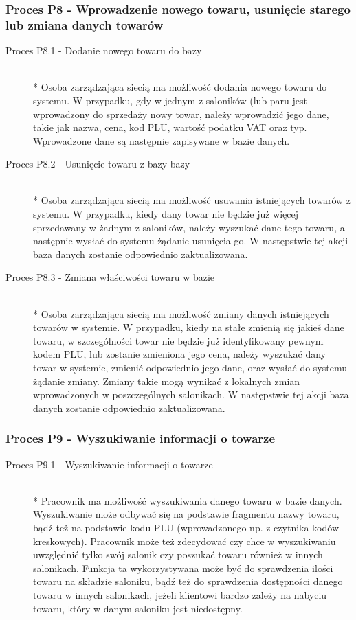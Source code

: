 \subsubsection{Proces P8 - Wprowadzenie nowego towaru, usunięcie starego lub zmiana danych towarów}
\begin{description}
\item[Proces P8.1 - Dodanie nowego towaru do bazy] ~\\*
Osoba zarządzająca siecią ma możliwość dodania nowego towaru do systemu. W przypadku, gdy w jednym z saloników (lub paru jest wprowadzony do sprzedaży nowy towar, należy wprowadzić jego dane, takie jak nazwa, cena, kod PLU, wartość podatku VAT oraz typ. Wprowadzone dane są następnie zapisywane w bazie danych.
\item[Proces P8.2 - Usunięcie towaru z bazy bazy] ~\\*
Osoba zarządzająca siecią ma możliwość usuwania istniejących towarów z systemu. W przypadku, kiedy dany towar nie będzie już więcej sprzedawany w żadnym z saloników, należy wyszukać dane tego towaru, a następnie wysłać do systemu żądanie usunięcia go. W następstwie tej akcji baza danych zostanie odpowiednio zaktualizowana.
\item[Proces P8.3 - Zmiana właściwości towaru w bazie] ~\\*
Osoba zarządzająca siecią ma możliwość zmiany danych istniejących towarów w systemie. W przypadku, kiedy na stałe zmienią się jakieś dane towaru, w szczególności towar nie będzie już identyfikowany pewnym kodem PLU, lub zostanie zmieniona jego cena, należy wyszukać dany towar w systemie, zmienić odpowiednio jego dane, oraz wysłać do systemu żądanie zmiany. Zmiany takie mogą wynikać z lokalnych zmian wprowadzonych w poszczególnych salonikach. W następstwie tej akcji baza danych zostanie odpowiednio zaktualizowana.
\end{description}
\subsubsection{Proces P9 - Wyszukiwanie informacji o towarze}
\begin{description}
\item[Proces P9.1 - Wyszukiwanie informacji o towarze] ~\\*
Pracownik ma możliwość wyszukiwania danego towaru w bazie danych. Wyszukiwanie może odbywać się na podstawie fragmentu nazwy towaru, bądź też na podstawie kodu PLU (wprowadzonego np. z czytnika kodów kreskowych). Pracownik może też zdecydować czy chce w wyszukiwaniu uwzględnić tylko swój salonik czy poszukać towaru również w innych salonikach. Funkcja ta wykorzystywana może być do sprawdzenia ilości towaru na składzie saloniku, bądź też do sprawdzenia dostępności danego towaru w innych salonikach, jeżeli klientowi bardzo zależy na nabyciu towaru, który w danym saloniku jest niedostępny.
\end{description}